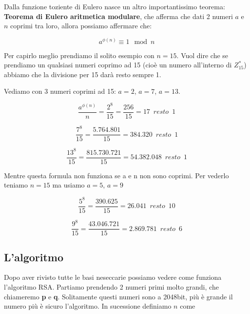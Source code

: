 \documentclass{rapport}
\begin{document}
\newpage
Dalla funzione toziente di Eulero nasce un altro importantissimo teorema: \textbf{Teorema di Eulero aritmetica modulare}, che afferma che dati 2 numeri $a$ e $n$ coprimi tra loro, allora possiamo affermare che:

 \begin{equation}\label{eq:2}
    a^{\phi(n)} \equiv 1 \mod n
\end{equation}

Per capirlo meglio prendiamo il solito esempio con $n=15$. Vuol dire che se prendiamo un qualsiasi numeri coprimo ad 15 (cioè un numero all'interno di $Z_{15}^*$) abbiamo che la divisione per 15 darà resto sempre 1.

Vediamo con 3 numeri coprimi ad 15: $a=2$, $a=7$, $a=13$.

\begin{equation*}
    \frac{a^{\phi(n)}}{n} = \frac{2^8}{15} =  \frac{256}{15} = 17  \,\,\, resto \,\,\, 1
\end{equation*}

\begin{equation*}
    \frac{7^8}{15} =  \frac{5.764.801}{15} = 384.320 \,\,\, resto \,\,\, 1
\end{equation*}

\begin{equation*}
    \frac{13^8}{15} =  \frac{815.730.721}{15} = 54.382.048 \,\,\, resto \,\,\, 1
\end{equation*}

Mentre questa formula non funziona se a e n non sono coprimi. Per vederlo teniamo $n=15$ ma usiamo $a=5$, $a=9$


\begin{equation*}
    \frac{5^8}{15} =  \frac{390.625}{15} = 26.041 \,\,\, resto \,\,\, 10
\end{equation*}

\begin{equation*}
    \frac{9^8}{15} =  \frac{43.046.721}{15} = 2.869.781 \,\,\, resto \,\,\, 6
\end{equation*}


\newpage
\subsection{L'algoritmo}
Dopo aver rivisto tutte le basi neseccarie possiamo vedere come funziona l'algoritmo RSA. Partiamo prendendo 2 numeri primi molto grandi, che chiameremo \textbf{p} e \textbf{q}. Solitamente questi numeri sono a 2048bit, più è grande il numero più è sicuro l'algoritmo. In sucessione definiamo $n$ come
\end{document}
